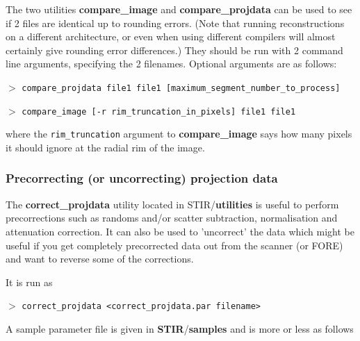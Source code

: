 \documentclass{article}
\newcommand{\cmdline}[1]{\par \noindent $>$ \texttt{#1}\par}
\begin{document}
The two utilities \textbf{compare\_image} and \textbf{compare\_projdata} 
can be used to see if 2 files are identical up to rounding errors. 
(Note that running reconstructions on a different architecture, 
or even when using different compilers will almost certainly 
give rounding error differences.) They should be run with 2 command 
line arguments, specifying the 2 filenames. Optional arguments 
are as follows:
\cmdline{compare\_projdata file1 file1 
[maximum\_segment\_number\_to\_process]}
\cmdline{compare\_image [-r rim\_truncation\_in\_pixels] file1 file1}


where the \texttt{rim\_truncation} argument to \textbf{compare\_image}  says 
how many pixels it should ignore at the radial rim of the image.



\subsubsection{
Precorrecting (or uncorrecting) projection data}

The \textbf{correct\_projdata} utility located in STIR/\textbf{utilities} 
is useful to perform precorrections such as randoms and/or scatter 
subtraction, normalisation and attenuation correction. It can 
also be used to 'uncorrect' the data which might be useful if 
you get completely precorrected data out from the scanner (or 
FORE) and want to reverse some of the corrections.


It is run as
\cmdline{correct\_projdata \texttt{<}correct\_projdata.par filename\texttt{>}}


A sample parameter file is given in \textbf{STIR}/\textbf{samples} and 
is more or less as follows
\end{document}
